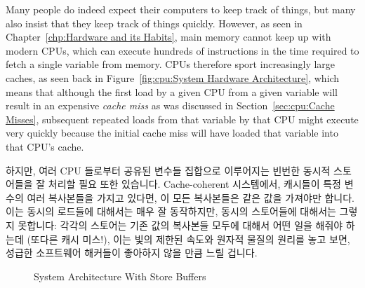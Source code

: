 Many people do indeed expect their computers to keep track of things,
but many also insist that they keep track of things quickly.
However, as seen in Chapter~\ref{chp:Hardware and its Habits},
main memory cannot keep up with modern CPUs, which can execute
hundreds of instructions in the time required to fetch a single variable
from memory.
CPUs therefore sport increasingly large caches, as seen back in
Figure~\ref{fig:cpu:System Hardware Architecture}, which means that
although the first load by a given CPU from a given variable will
result in an expensive \emph{cache miss} as was discussed in
Section~\ref{sec:cpu:Cache Misses}, subsequent
repeated loads from that variable by that CPU might execute
very quickly because the initial cache miss will have loaded that
variable into that CPU's cache.
\fi

하지만, 여러 CPU 들로부터 공유된 변수들 집합으로 이루어지는 빈번한 동시적
스토어들을 잘 처리할 필요 또한 있습니다.
Cache-coherent 시스템에서, 캐시들이 특정 변수의 여러 복사본들을 가지고 있다면,
이 모든 복사본들은 같은 값을 가져야만 합니다.
이는 동시의 로드들에 대해서는 매우 잘 동작하지만, 동시의 스토어들에 대해서는
그렇지 못합니다:  각각의 스토어는 기존 값의 복사본들 모두에 대해서 어떤 일을
해줘야 하는데 (또다른 캐시 미스!), 이는 빛의 제한된 속도와 원자적 물질의 원리를
놓고 보면, 성급한 소프트웨어 해커들이 좋아하지 않을 만큼 느릴 겁니다.

\begin{figure}[tb]
\centering
{}
\caption{System Architecture With Store Buffers}
\label{fig:memorder:System Architecture With Store Buffers}
\end{figure}

